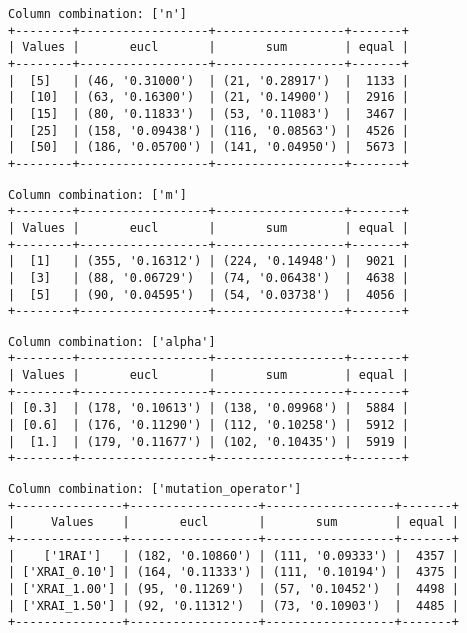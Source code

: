 \documentclass{article}
\begin{document}
\begin{verbatim}
Column combination: ['n']
+--------+------------------+------------------+-------+
| Values |       eucl       |       sum        | equal |
+--------+------------------+------------------+-------+
|  [5]   | (46, '0.31000')  | (21, '0.28917')  |  1133 |
|  [10]  | (63, '0.16300')  | (21, '0.14900')  |  2916 |
|  [15]  | (80, '0.11833')  | (53, '0.11083')  |  3467 |
|  [25]  | (158, '0.09438') | (116, '0.08563') |  4526 |
|  [50]  | (186, '0.05700') | (141, '0.04950') |  5673 |
+--------+------------------+------------------+-------+
\end{verbatim}

\begin{verbatim}
Column combination: ['m']
+--------+------------------+------------------+-------+
| Values |       eucl       |       sum        | equal |
+--------+------------------+------------------+-------+
|  [1]   | (355, '0.16312') | (224, '0.14948') |  9021 |
|  [3]   | (88, '0.06729')  | (74, '0.06438')  |  4638 |
|  [5]   | (90, '0.04595')  | (54, '0.03738')  |  4056 |
+--------+------------------+------------------+-------+
\end{verbatim}

\begin{verbatim}
Column combination: ['alpha']
+--------+------------------+------------------+-------+
| Values |       eucl       |       sum        | equal |
+--------+------------------+------------------+-------+
| [0.3]  | (178, '0.10613') | (138, '0.09968') |  5884 |
| [0.6]  | (176, '0.11290') | (112, '0.10258') |  5912 |
|  [1.]  | (179, '0.11677') | (102, '0.10435') |  5919 |
+--------+------------------+------------------+-------+
\end{verbatim}

\begin{verbatim}
Column combination: ['mutation_operator']
+---------------+------------------+------------------+-------+
|     Values    |       eucl       |       sum        | equal |
+---------------+------------------+------------------+-------+
|    ['1RAI']   | (182, '0.10860') | (111, '0.09333') |  4357 |
| ['XRAI_0.10'] | (164, '0.11333') | (111, '0.10194') |  4375 |
| ['XRAI_1.00'] | (95, '0.11269')  | (57, '0.10452')  |  4498 |
| ['XRAI_1.50'] | (92, '0.11312')  | (73, '0.10903')  |  4485 |
+---------------+------------------+------------------+-------+
\end{verbatim}
\end{document}
